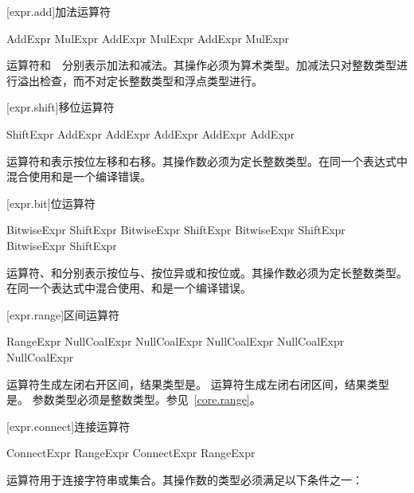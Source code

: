 [expr.add]{加法运算符}

\begin{bnf}{AddExpr}
    MulExpr \br
    AddExpr \terminal{+} MulExpr \br
    AddExpr \terminal{-} MulExpr
\end{bnf}

\pnum
运算符\tcode{+}和\ \tcode{-}\ 分别表示加法和减法。其操作必须为算术类型。加减法只对整数类型进行溢出检查，而不对定长整数类型和浮点类型进行。

[expr.shift]{移位运算符}

\begin{bnf}{ShiftExpr}
    AddExpr \br
    AddExpr  AddExpr \br
    AddExpr  AddExpr
\end{bnf}

\pnum
运算符和表示按位左移和右移。其操作数必须为定长整数类型。在同一个表达式中混合使用和是一个编译错误。

[expr.bit]{位运算符}

\begin{bnf}{BitwiseExpr}
    ShiftExpr \br
    BitwiseExpr  ShiftExpr \br
    BitwiseExpr  ShiftExpr \br
    BitwiseExpr  ShiftExpr
\end{bnf}

\pnum
运算符、和分别表示按位与、按位异或和按位或。其操作数必须为定长整数类型。在同一个表达式中混合使用、和是一个编译错误。

[expr.range]{区间运算符}

\begin{bnf}{RangeExpr}
    NullCoalExpr \br
    NullCoalExpr  NullCoalExpr \br
    NullCoalExpr  NullCoalExpr
\end{bnf}

\pnum
运算符生成左闭右开区间，结果类型是。
运算符生成左闭右闭区间，结果类型是。
参数类型必须是整数类型。参见~\ref{core.range}。

[expr.connect]{连接运算符}

\begin{bnf}{ConnectExpr}
    RangeExpr \br
    ConnectExpr \terminal{\~} RangeExpr
\end{bnf}

\pnum
运算符\tcode{\~}用于连接字符串或集合。其操作数的类型必须满足以下条件之一：

